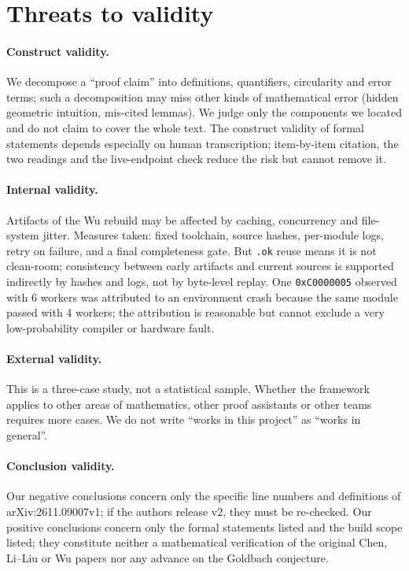 \documentclass[11pt,a4paper]{article}
\theoremstyle{plain}
\theoremstyle{definition}
\begin{document}
\section{Threats to validity}
\label{sec:threats}

\paragraph{Construct validity.}
We decompose a ``proof claim'' into definitions, quantifiers, circularity and error terms; such a decomposition may miss other kinds of mathematical error (hidden geometric intuition, mis-cited lemmas). We judge only the components we located and do not claim to cover the whole text. The construct validity of formal statements depends especially on human transcription; item-by-item citation, the two readings and the live-endpoint check reduce the risk but cannot remove it.

\paragraph{Internal validity.}
Artifacts of the Wu rebuild may be affected by caching, concurrency and file-system jitter. Measures taken: fixed toolchain, source hashes, per-module logs, retry on failure, and a final completeness gate. But \texttt{.ok} reuse means it is not clean-room; consistency between early artifacts and current sources is supported indirectly by hashes and logs, not by byte-level replay. One \texttt{0xC0000005} observed with 6 workers was attributed to an environment crash because the same module passed with 4 workers; the attribution is reasonable but cannot exclude a very low-probability compiler or hardware fault.

\paragraph{External validity.}
This is a three-case study, not a statistical sample. Whether the framework applies to other areas of mathematics, other proof assistants or other teams requires more cases. We do not write ``works in this project'' as ``works in general''.

\paragraph{Conclusion validity.}
Our negative conclusions concern only the specific line numbers and definitions of arXiv:2611.09007v1; if the authors release v2, they must be re-checked. Our positive conclusions concern only the formal statements listed and the build scope listed; they constitute neither a mathematical verification of the original Chen, Li--Liu or Wu papers nor any advance on the Goldbach conjecture.
\end{document}
